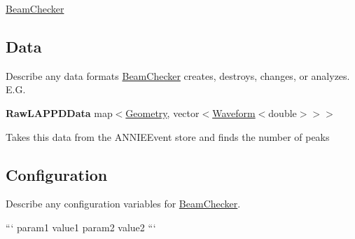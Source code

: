 \hyperlink{classBeamChecker}{Beam\-Checker}

\subsection*{Data}

Describe any data formats \hyperlink{classBeamChecker}{Beam\-Checker} creates, destroys, changes, or analyzes. E.\-G.

{\bfseries Raw\-L\-A\-P\-P\-D\-Data} {\ttfamily map$<$\hyperlink{classGeometry}{Geometry}, vector$<$\hyperlink{classWaveform}{Waveform}$<$double$>$$>$$>$}
\begin{DoxyItemize}
\item Takes this data from the {\ttfamily A\-N\-N\-I\-E\-Event} store and finds the number of peaks
\end{DoxyItemize}

\subsection*{Configuration}

Describe any configuration variables for \hyperlink{classBeamChecker}{Beam\-Checker}.

``` param1 value1 param2 value2 ``` 